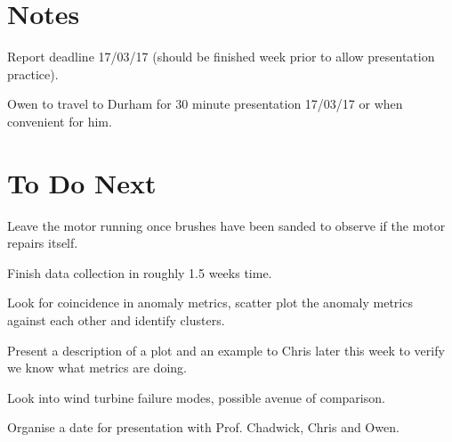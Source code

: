 \documentclass[11pt]{meetingmins}
\begin{document}
\maketitle


\section{Notes}
\begin{items}
\item
Report deadline 17/03/17 (should be finished week prior to allow presentation practice).

\item
Owen to travel to Durham for 30 minute presentation 17/03/17 or when convenient for him.

\end{items}

\section{To Do Next}
\begin{items}
\item
Leave the motor running once brushes have been sanded to observe if the motor repairs itself.

\item
Finish data collection in roughly 1.5 weeks time.

\item
Look for coincidence in anomaly metrics, scatter plot the anomaly metrics against each other and identify clusters.

\item
Present a description of a plot and an example to Chris later this week to verify we know what metrics are doing.

\item
Look into wind turbine failure modes, possible avenue of comparison.

\item
Organise a date for presentation with Prof. Chadwick, Chris and Owen.

\end{items}
\end{document}

